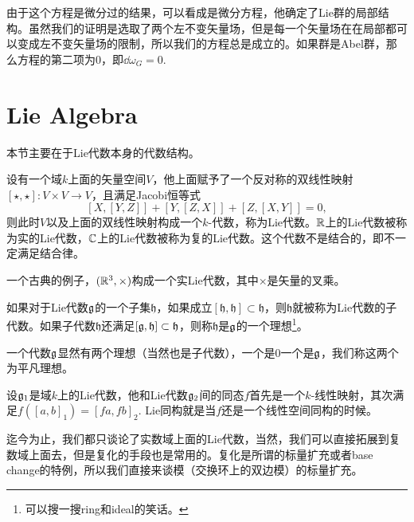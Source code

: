 由于这个方程是微分过的结果，可以看成是微分方程，他确定了Lie群的局部结构。虽然我们的证明是选取了两个左不变矢量场，但是每一个矢量场在在局部都可以变成左不变矢量场的限制，所以我们的方程总是成立的。如果群是Abel群，那么方程的第二项为0，即$\dd \omega_G=0$.

\section{Lie Algebra}

本节主要在于Lie代数本身的代数结构。

\para 设有一个域$k$上面的矢量空间$V$，他上面赋予了一个反对称的双线性映射$[\star,\star]:V\times V\to V$，且满足Jacobi恒等式
\[
[X,[Y,Z]]+[Y,[Z,X]]+[Z,[X,Y]]=0,
\]
则此时$V$以及上面的双线性映射构成一个$k$-代数，称为Lie代数。$\mathbb{R}$上的Lie代数被称为实的Lie代数，$\mathbb{C}$上的Lie代数被称为复的Lie代数。这个代数不是结合的，即不一定满足结合律。

一个古典的例子，$(\mathbb{R}^3,\times)$构成一个实Lie代数，其中$\times$是矢量的叉乘。

\para 如果对于Lie代数${\mathfrak{g}}$的一个子集$\mathfrak{h}$，如果成立$[\mathfrak{h},\mathfrak{h}]\subset \mathfrak{h}$，则$\mathfrak{h}$就被称为Lie代数的子代数。如果子代数$\mathfrak{h}$还满足$[{\mathfrak{g}},\mathfrak{h}]\subset \mathfrak{h}$，则称$\mathfrak{h}$是${\mathfrak{g}}$的一个{\kaishu 理想}\footnote{可以搜一搜ring和ideal的笑话。}。

一个代数${\mathfrak{g}}$显然有两个理想（当然也是子代数），一个是$0$一个是${\mathfrak{g}}$，我们称这两个为平凡理想。



\para 设${\mathfrak{g}}_1$是域$k$上的Lie代数，他和Lie代数${\mathfrak{g}}_2$间的同态$f$首先是一个$k$-线性映射，其次满足$f([a,b]_1)=[fa,fb]_2$. Lie同构就是当$f$还是一个线性空间同构的时候。

迄今为止，我们都只谈论了实数域上面的Lie代数，当然，我们可以直接拓展到复数域上面去，但是复化的手段也是常用的。复化是所谓的标量扩充或者base change的特例，所以我们直接来谈模（交换环上的双边模）的标量扩充。

